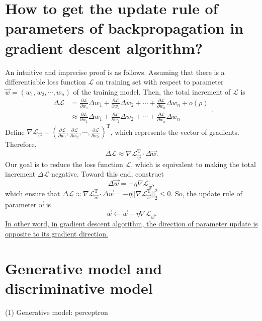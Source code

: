 \documentclass[10pt,onecolumn]{book}
\begin{document}
\section{How to get the update rule of parameters of backpropagation in gradient descent algorithm?}
An intuitive and imprecise proof is as follows. Assuming that there is a differentiable loss function $\mathcal{L}$ on training set with respect to parameter $\vec{w} = (w_1, w_2, \cdots, w_n)$ of the training model. Then, the total increment of $\mathcal{L}$ is
\begin{equation}
\begin{split}
\Delta \mathcal{L} & = \frac{\partial \mathcal{L}}{\partial w_1} \Delta w_1 + \frac{\partial \mathcal{L}}{\partial w_2} \Delta w_2 + \cdots + \frac{\partial \mathcal{L}}{\partial w_n} \Delta w_n + o(\rho) \\
				   & \approx \frac{\partial \mathcal{L}}{\partial w_1} \Delta w_1 + \frac{\partial \mathcal{L}}{\partial w_2} \Delta w_2 + \cdots + \frac{\partial \mathcal{L}}{\partial w_n} \Delta w_n
\end{split}.
\end{equation}
Define $\nabla \mathcal{L}_{\vec{w}} = (\frac{\partial \mathcal{L}}{\partial w_1}, \frac{\partial \mathcal{L}}{\partial w_2}, \cdots, \frac{\partial \mathcal{L}}{\partial w_n})^\mathrm{T}$, which represents the vector of gradients. Therefore, 
\begin{equation}
\Delta \mathcal{L} \approx \nabla \mathcal{L}_{\vec{w}}^\mathrm{T} \cdot \Delta \vec{w}.
\end{equation}
Our goal is to reduce the loss function $\mathcal{L}$, which is equivalent to making the total increment $\Delta \mathcal{L}$ negative. Toward this end, construct 
\begin{equation}
\Delta \vec{w} = -\eta \nabla \mathcal{L}_{\vec{w}},
\end{equation}
which ensure that $\Delta \mathcal{L} \approx \nabla \mathcal{L}_{\vec{w}}^\mathrm{T} \cdot \Delta \vec{w} = - \eta ||\nabla \mathcal{L}_{\vec{w}}^\mathrm{T}||_2^2 \le 0$. So, the update rule of parameter $\vec{w}$ is 
\begin{equation}
\vec{w} \gets \vec{w} -\eta \nabla \mathcal{L}_{\vec{w}}.
\end{equation}
\uline{In other word, in gradient descent algorithm, the direction of parameter update is opposite to its gradient direction.}

\section{Generative model and discriminative model}
(1) Generative model: perceptron
\end{document}
